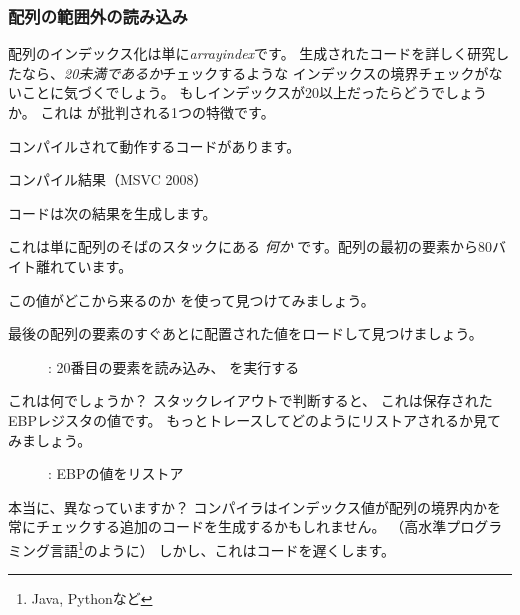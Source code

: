 ﻿\subsubsection{配列の範囲外の読み込み}

配列のインデックス化は単に\emph{array\lbrack{}index\rbrack}です。
生成されたコードを詳しく研究したなら、\emph{20未満であるか}チェックするような
インデックスの境界チェックがないことに気づくでしょう。
もしインデックスが20以上だったらどうでしょうか。
これは \CCpp が批判される1つの特徴です。

コンパイルされて動作するコードがあります。



コンパイル結果（MSVC 2008）



コードは次の結果を生成します。



これは単に配列のそばのスタックにある \emph{何か} です。配列の最初の要素から80バイト離れています。

\clearpage
\myindex{\olly}
この値がどこから来るのか \olly を使って見つけてみましょう。

最後の配列の要素のすぐあとに配置された値をロードして見つけましょう。

\begin{figure}[H]
\centering
{}
\caption{\olly: 20番目の要素を読み込み、 \printf を実行する}
\label{fig:array_BO_olly_r1}
\end{figure}

これは何でしょうか？
スタックレイアウトで判断すると、
これは保存されたEBPレジスタの値です。
\clearpage
もっとトレースしてどのようにリストアされるか見てみましょう。

\begin{figure}[H]
\centering
{}
\caption{\olly: EBPの値をリストア}
\label{fig:array_BO_olly_r2}
\end{figure}

本当に、異なっていますか？
コンパイラはインデックス値が配列の境界内かを常にチェックする追加のコードを生成するかもしれません。
（高水準プログラミング言語\footnote{Java, Pythonなど}のように）
しかし、これはコードを遅くします。
